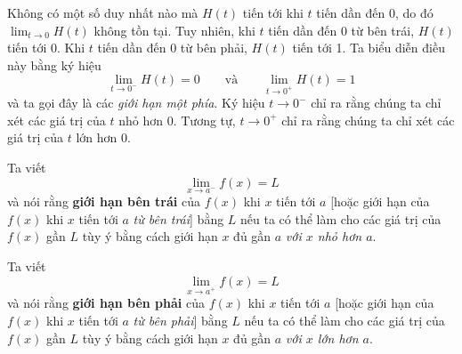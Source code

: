 \vspace{0.45em}
\noindent
Không có một số duy nhất nào mà $H(t)$ tiến tới khi $t$ tiến dần đến 0, do đó $\lim_{t \to 0} H(t)$ không tồn tại. Tuy nhiên, khi $t$ tiến dần đến 0 từ bên trái, $H(t)$ tiến tới 0. Khi $t$ tiến dần đến 0 từ bên phải, $H(t)$ tiến tới 1. Ta biểu diễn điều này bằng ký hiệu
\[
\lim_{t \to 0^-} H(t) = 0 \qquad \text{và} \qquad \lim_{t \to 0^+} H(t) = 1
\]
và ta gọi đây là các \emph{giới hạn một phía}. Ký hiệu $t \to 0^-$ chỉ ra rằng chúng ta chỉ xét các giá trị của $t$ nhỏ hơn 0. Tương tự, $t \to 0^+$ chỉ ra rằng chúng ta chỉ xét các giá trị của $t$ lớn hơn 0.

\vspace{0.6em}
\begin{tcolorbox}[
  colback=white,
  colframe=stewartred,
  boxrule=1.1pt,
  sharp corners,
  boxsep=0pt,
  left=8pt,
  right=8pt,
  top=7pt,
  bottom=7pt
]
\noindent
{\setlength{\fboxrule}{1pt}\setlength{\fboxsep}{2.5pt}}\hspace{1.5em}Ta viết
\vspace{-0.2em}
\[
\lim_{x \to a^-} f(x) = L
\]
\vspace{-0.3em}
\noindent
và nói rằng \textbf{giới hạn bên trái} của $f(x)$ khi $x$ tiến tới $a$ [hoặc giới hạn của $f(x)$ khi $x$ tiến tới $a$ \emph{từ bên trái}] bằng $L$ nếu ta có thể làm cho các giá trị của $f(x)$ gần $L$ tùy ý bằng cách giới hạn $x$ đủ gần $a$ \emph{với $x$ nhỏ hơn $a$}.

\vspace{0.5em}
\noindent\hspace{1.5em}Ta viết
\vspace{-0.2em}
\[
\lim_{x \to a^+} f(x) = L
\]
\vspace{-0.3em}
\noindent
và nói rằng \textbf{giới hạn bên phải} của $f(x)$ khi $x$ tiến tới $a$ [hoặc giới hạn của $f(x)$ khi $x$ tiến tới $a$ \emph{từ bên phải}] bằng $L$ nếu ta có thể làm cho các giá trị của $f(x)$ gần $L$ tùy ý bằng cách giới hạn $x$ đủ gần $a$ \emph{với $x$ lớn hơn $a$}.
\end{tcolorbox}
